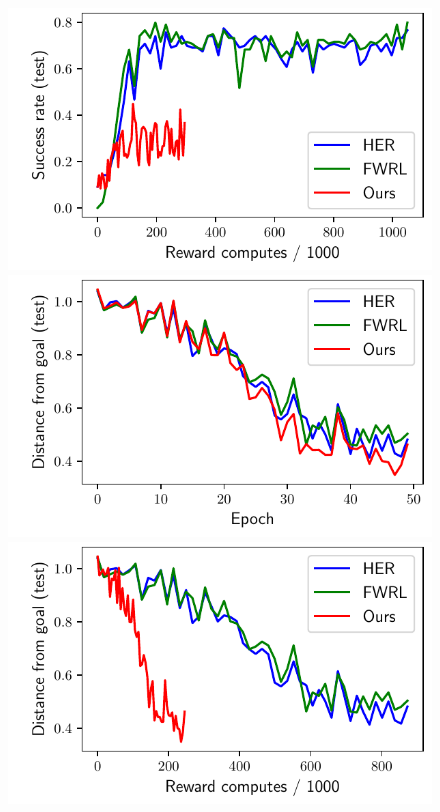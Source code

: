 \begin{figure}
  \includegraphics[width=\frac\columnwidth]{media/res/6efc1de-path_reward_low_thresh_chosen-HandReachPR-v0-dqst/reward_computes-test/success_rate.pdf}\\
  \includegraphics[width=\frac\columnwidth]{media/res/6efc1de-path_reward_low_thresh_chosen-HandManipulateBlockRotateXYZPR-v0-dqst/epoch-test/ag_g_dist.pdf}%
  \includegraphics[width=\frac\columnwidth]{media/res/6efc1de-path_reward_low_thresh_chosen-HandManipulateBlockRotateXYZPR-v0-dqst/reward_computes-test/ag_g_dist.pdf}%

\end{figure}
